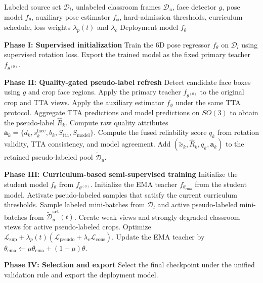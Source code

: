 \documentclass[preprint,12pt]{elsarticle}
\begin{document}
\begin{algorithm}[!htbp]
\footnotesize
\caption{QES6D training and pseudo-label admission workflow}
\label{alg:qes6d}
\begin{algorithmic}[1]
\Require Labeled source set $\mathcal{D}_l$, unlabeled classroom frames $\mathcal{D}_u$, face detector $g$, pose model $f_\theta$, auxiliary pose estimator $f_\phi$, hard-admission thresholds, curriculum schedule, loss weights $\lambda_p(t)$ and $\lambda_c$
\Ensure Deployment model $f_\theta$

\State \textbf{Phase I: Supervised initialization}
\State Train the 6D pose regressor $f_\theta$ on $\mathcal{D}_l$ using supervised rotation loss.
\State Export the trained model as the fixed primary teacher $f_{\theta^{(0)}}$.

\State \textbf{Phase II: Quality-gated pseudo-label refresh}
 \State Detect candidate face boxes using $g$ and crop face regions.
 \State Apply the primary teacher $f_{\theta^{(0)}}$ to the original crop and TTA views.
 \State Apply the auxiliary estimator $f_\phi$ under the same TTA protocol.
 \State Aggregate TTA predictions and model predictions on $SO(3)$ to obtain the pseudo-label $\hat{R}_k$.
 \State Compute raw quality attributes $\mathbf{a}_k=\{d_k,s_k^{\mathrm{face}},b_k,S_{\mathrm{tta}},S_{\mathrm{model}}\}$.
 \State Compute the fused reliability score $q_k$ from rotation validity, TTA consistency, and model agreement.
 \State Add $(\tilde{x}_k,\hat{R}_k,q_k,\mathbf{a}_k)$ to the retained pseudo-labeled pool $\tilde{\mathcal{D}}_u$.
 \EndIf
 \EndFor
\EndFor

\State \textbf{Phase III: Curriculum-based semi-supervised training}
\State Initialize the student model $f_\theta$ from $f_{\theta^{(0)}}$.
\State Initialize the EMA teacher $f_{\theta_{\mathrm{ema}}}$ from the student model.
 \State Activate pseudo-labeled samples that satisfy the current curriculum thresholds.
 \State Sample labeled mini-batches from $\mathcal{D}_l$ and active pseudo-labeled mini-batches from $\tilde{\mathcal{D}}_u^{\mathrm{act}}(t)$.
 \State Create weak views and strongly degraded classroom views for active pseudo-labeled crops.
 \State Optimize $\mathcal{L}_{\mathrm{sup}}+\lambda_p(t)(\mathcal{L}_{\mathrm{pseudo}}+\lambda_c\mathcal{L}_{\mathrm{cons}})$.
 \State Update the EMA teacher by $\theta_{\mathrm{ema}}\leftarrow \mu\theta_{\mathrm{ema}}+(1-\mu)\theta$.
\EndFor

\State \textbf{Phase IV: Selection and export}
\State Select the final checkpoint under the unified validation rule and export the deployment model.
\end{algorithmic}
\end{algorithm}
\end{document}
